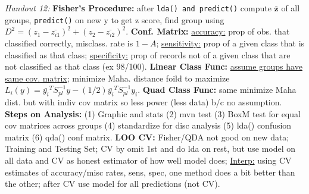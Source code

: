 \documentclass[9pt]{extarticle}
\begin{document}
\textit{Handout 12:}
\textbf{Fisher's Procedure:} after \texttt{lda() and predict()} compute 
$\boldsymbol{\bar{z}}$ of all groups, \texttt{predict()} on new y to get z score, 
find group using $D^2 = (z_1 - \bar{z_{i1}})^2 + (z_2 - \bar{z_{i2}})^2$.
\textbf{Conf. Matrix:} \underline{accuracy:} prop of obs. that classified 
correctly, misclass. rate is $1-A$; \underline{sensitivity:} prop of a given 
class that is classified as that class; \underline{specificity:} prop of records 
not of a given class that are not classified as that class (ex 98/100).
\textbf{Linear Class Func:} \underline{assume groups have same cov. matrix};
minimize Maha. distance foild to maximize $L_i(y) = \bar{y_i}^TS_{pl}^{-1}y - (1/2)
\bar{y_i}^TS_{pl}^{-1}y_i$.
\textbf{Quad Class Func:} same minimize Maha dist. but with indiv cov matrix 
so less power (less data) b/c no assumption.
\textbf{Steps on Analysis:} (1) Graphic and stats (2) mvn test (3) BoxM test
for equal cov matrices across groups (4) standardize for disc analysis (5)
lda() confusion matrix (6) qda() conf matrix.
\textbf{LOO CV:} Fisher/QDA not good on new data; Training and Testing Set; 
CV by omit 1st and do lda on rest, but use model on all data and CV as honest 
estimator of how well model does; \underline{Interp:} using CV estimates of 
accuracy/misc rates, sens, spec, one method does a bit better than the other; 
after CV use model for all predictions (not CV).
\end{document}
